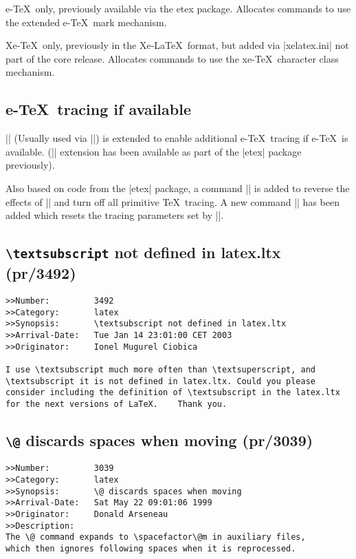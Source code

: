 \documentclass{ltxguide}
\newcommand\Lpack[1]{\textsf{#1}}
\newcommand\DescribeMacro[1]{\texttt{\string#1}}
\begin{document}
\DescribeMacro{\newmarks}
\smallskip

e-\TeX\ only, previously available via the \Lpack{etex} package.
Allocates commands to use the extended  e-\TeX\ mark mechanism.

\DescribeMacro{\newXeTeXintercharclass}
\smallskip

Xe-\TeX\ only, previously in the Xe-\LaTeX\ format, but added via
|xelatex.ini| not part of the core release. 
Allocates commands to use the xe-\TeX\ character class mechanism.


\subsection{e-\TeX\ tracing if available}
|\loggingall| (Usually used via |\tracingall|) is extended to enable
additional e-\TeX\ tracing if e-\TeX\ is available. (|\tracingall|
extension has been available as part of the |etex| package previously).

Also based on code from the |etex| package, a command |\tracingnone|
is added to reverse the effects of |\tracingall| and turn off all primitive
\TeX\ tracing. A new command |\hideoutput| has been  added which resets the
tracing parameters set by |\showoutput|.




\subsection{\texttt{\textbackslash textsubscript} not defined in
   latex.ltx (pr/3492)}

\begin{verbatim}
>>Number:         3492
>>Category:       latex
>>Synopsis:       \textsubscript not defined in latex.ltx
>>Arrival-Date:   Tue Jan 14 23:01:00 CET 2003
>>Originator:     Ionel Mugurel Ciobica

I use \textsubscript much more often than \textsuperscript, and
\textsubscript it is not defined in latex.ltx. Could you please
consider including the definition of \textsubscript in the latex.ltx
for the next versions of LaTeX.    Thank you.
\end{verbatim}

\subsection{\texttt{\textbackslash @} discards spaces when moving
            (pr/3039)}

\begin{verbatim}
>>Number:         3039
>>Category:       latex
>>Synopsis:       \@ discards spaces when moving
>>Arrival-Date:   Sat May 22 09:01:06 1999
>>Originator:     Donald Arseneau
>>Description:
The \@ command expands to \spacefactor\@m in auxiliary files,
which then ignores following spaces when it is reprocessed.
\end{verbatim}
\end{document}
